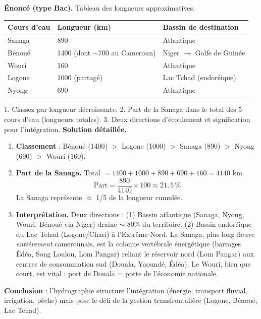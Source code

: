 \documentclass[11pt]{article}
\newcommand{\cle}[1]{{\popxbold\color{popdark}#1}}
\begin{document}
\begin{exoresolu}
\textbf{Énoncé (type Bac).} Tableau des longueurs approximatives.

\begin{center}
\begin{tabularx}{\linewidth}{|l|X|X|}
\hline
\rowcolor{popblueL} Cours d'eau & Longueur (km) & Bassin de destination \\
\hline
Sanaga & 890 & Atlantique \\
\hline
Bénoué & \num{1400} (dont $\sim$700 au Cameroun) & Niger $\to$ Golfe de Guinée \\
\hline
Wouri & 160 & Atlantique \\
\hline
Logone & \num{1000} (partagé) & Lac Tchad (endoréique) \\
\hline
Nyong & 690 & Atlantique \\
\hline
\end{tabularx}
\end{center}

1. Classez par longueur décroissante. 2. Part de la Sanaga dans le total des 5 cours d'eau (longueurs totales). 3. Deux directions d'écoulement et signification pour l'intégration.
\tcblower
\textbf{Solution détaillée.}
\begin{enumerate}
\item \textbf{Classement} : Bénoué (\num{1400}) $>$ Logone (\num{1000}) $>$ Sanaga (890) $>$ Nyong (690) $>$ Wouri (160).
\item \textbf{Part de la Sanaga.} Total $= 1400 + 1000 + 890 + 690 + 160 = \num{4140}$ km.
\[ \text{Part} = \frac{890}{4140} \times 100 \approx 21,5\,\% \]
La Sanaga représente $\approx$ 1/5 de la longueur cumulée.
\item \textbf{Interprétation.} Deux directions : (1) \cle{Bassin atlantique} (Sanaga, Nyong, Wouri, Bénoué via Niger) draine $\sim$ 80\% du territoire. (2) \cle{Bassin endoréique du Lac Tchad} (Logone/Chari) à l'Extrême-Nord. La Sanaga, plus long fleuve \emph{entièrement} camerounais, est la colonne vertébrale énergétique (barrages Édéa, Song Loulou, Lom Pangar) reliant le réservoir nord (Lom Pangar) aux centres de consommation sud (Douala, Yaoundé, Édéa). Le Wouri, bien que court, est vital : port de Douala = porte de l'économie nationale.
\end{enumerate}
\textbf{Conclusion} : l'hydrographie structure l'intégration (énergie, transport fluvial, irrigation, pêche) mais pose le défi de la gestion transfrontalière (Logone, Bénoué, Lac Tchad).
\end{exoresolu}
\end{document}
